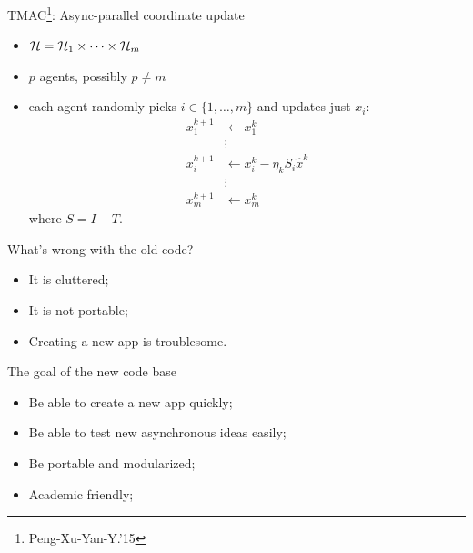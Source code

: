 \documentclass[hyperref,handout,compress,9pt,mathserif]{beamer}
\begin{document}
\begin{frame}{TMAC\footnote{Peng-Xu-Yan-Y.'15}: Async-parallel coordinate update}

\begin{itemize}
  \item ${\mathcal{H}} = {\mathcal{H}}_1 \times \cdots \times {\mathcal{H}}_m$
  \item $p$ agents, possibly $p\not=m$
  \item each agent {randomly picks} $i\in\{1,\ldots,m\}$ and updates just $x_i$:
\begin{align*}
x_1^{k+1}&\gets x_1^k\\
&\vdots\\
x_i^{k+1}&\gets x_i^k - \eta_k S_i {\hat{x}^k}\\
&\vdots\\
x_{m}^{k+1}&\gets x_{m}^k
\end{align*}
where $S = I - T$.
\end{itemize}
\end{frame}

\begin{frame}{What's wrong with the old code?}
\begin{itemize}
\item It is cluttered;
\item It is not portable;
\item Creating a new app is troublesome.
\end{itemize}
\end{frame}

\begin{frame}{The goal of the new code base}
\begin{itemize}
\item Be able to create a new app quickly;
\item Be able to test new asynchronous ideas easily;
\item Be portable and modularized;
\item Academic friendly;
\end{itemize}
\end{frame}
\end{document}
